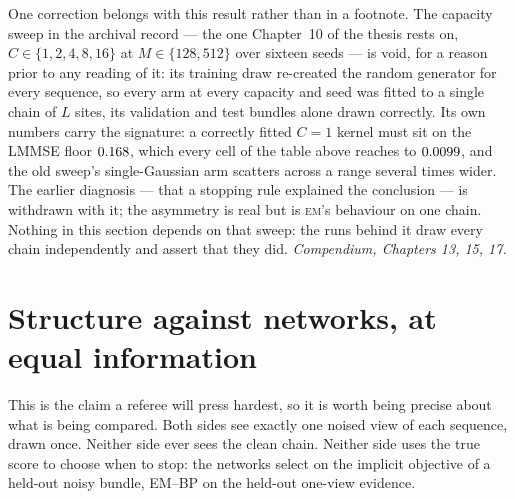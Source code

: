 \documentclass[11pt,a4paper]{article}
\newcommand{\ncomp}{C}
\newcommand{\nseq}{M}
\newcommand{\nsites}{L}
\newcommand{\comp}[1]{{\small\textit{Compendium, #1.}}}
\begin{document}
\smallskip
\noindent
One correction belongs with this result rather than in a footnote. The capacity sweep in the
archival record --- the one Chapter~10 of the thesis rests on, $\ncomp\in\{1,2,4,8,16\}$ at
$\nseq\in\{128,512\}$ over sixteen seeds --- is void, for a reason prior to any reading of it:
its training draw re-created the random generator for every sequence, so every arm at every
capacity and seed was fitted to a single chain of $\nsites$ sites, its validation and test
bundles alone drawn correctly. Its own numbers carry the signature: a correctly fitted
$\ncomp=1$ kernel must sit on the LMMSE floor $0.168$, which every cell of the
table above reaches to $0.0099$, and the old sweep's single-Gaussian arm scatters across a
range several times wider. The earlier diagnosis --- that a stopping rule explained the
conclusion --- is withdrawn with it; the asymmetry is real but is \textsc{em}'s behaviour on one
chain. Nothing in this section depends on that sweep: the runs behind it draw every chain
independently and assert that they did.
\comp{Chapters 13, 15, 17}

\section{Structure against networks, at equal information}

This is the claim a referee will press hardest, so it is worth being precise about what is being
compared. Both sides see exactly one noised view of each sequence, drawn once. Neither side ever
sees the clean chain. Neither side uses the true score to choose when to stop: the networks select
on the implicit objective of a held-out noisy bundle, EM--BP on the held-out one-view evidence.

\begin{table}[H]
\centering\small
\caption{Interface~C across correlation and length (\textsc{e14}, $\rbSeeds$ seeds, $\nseq=2048$,
networks re-screened inside each regime). Columns: the \textsc{lmmse} oracle; EM--BP with its
iteration count chosen by held-out evidence (ev.) and by validation against the true kernel (bp);
the best network trained by implicit score matching on the same one-view bundle (C); the best
network given the clean sequence with one fixed corruption (B); and the paired factor of the C
network over the evidence-selected EM--BP, with a percentile bootstrap over seeds.}
{\setlength{\tabcolsep}{4pt}}
\end{table}
\end{document}
